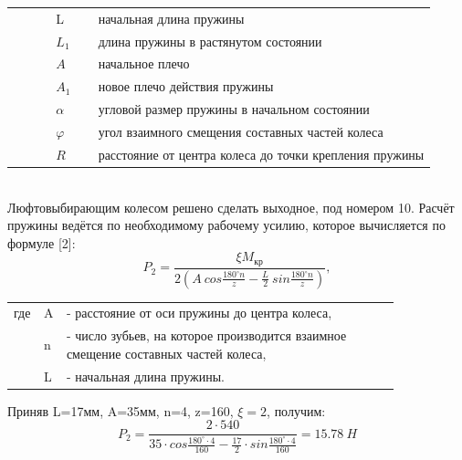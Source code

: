 \documentclass[14pt,a4paper,russian]{scrartcl}
\begin{document}
        \begin{table}[h]
                \begin{tabular}{p{0.1\linewidth}p{0.1\linewidth}p{0.8\linewidth}}
                    & L & начальная длина пружины \\
                    & \( L_1 \) & длина пружины в растянутом состоянии \\
                    & \( A \) & начальное плечо \\
                    & \( A_1 \) & новое плечо действия пружины \\
                    & \( \alpha \) & угловой размер пружины в начальном состоянии \\
                    & \( \varphi \) & угол взаимного смещения составных частей колеса \\
                    & \( R \) & расстояние от центра колеса до точки крепления пружины \\
                \end{tabular}
        \end{table}
        \\Люфтовыбирающим колесом решено сделать выходное, под номером 10.
        Расчёт пружины ведётся по необходимому рабочему усилию, которое
        вычисляется по формуле [2]:
        \[ P_2 = \frac{\xi M_{\text{кр}}}{2(A\ cos\frac{180^\circ n}{z}
                - \frac{L}{2}\ sin\frac{180^\circ n}{z})},\]
        \begin{table}[h!]
            \begin{center}
                \begin{tabular}{p{0.025\linewidth}p{0.01\linewidth}p{0.8\linewidth}}
                    где & A & - расстояние от оси пружины до центра колеса,\\
                    & n & - число зубьев, на которое производится взаимное смещение составных частей колеса,\\
                    & L & - начальная длина пружины.
                \end{tabular}
            \end{center}
        \end{table}

        Приняв L=17мм, A=35мм, n=4, 
        z=160, \( \xi=2 \), получим:
        \[ P_2 = \frac{2\cdot540}{35\cdot cos\frac{180^\circ\cdot4}{160}
                - \frac{17}{2}\cdot sin\frac{180^\circ\cdot4}{160}} = 15.78\ H\]
        
\end{document}
